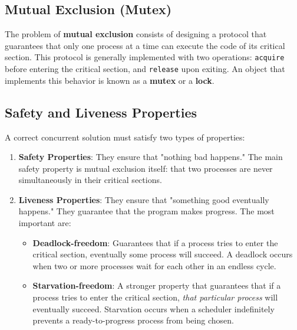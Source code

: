 \subsection{Mutual Exclusion (Mutex)}
The problem of \textbf{mutual exclusion} consists of designing a protocol that guarantees that only one process at a time can execute the code of its critical section. This protocol is generally implemented with two operations: \texttt{acquire} before entering the critical section, and \texttt{release} upon exiting. An object that implements this behavior is known as a \textbf{mutex} or a \textbf{lock}.

\subsection{Safety and Liveness Properties}
A correct concurrent solution must satisfy two types of properties:
\begin{enumerate}
    \item \textbf{Safety Properties}: They ensure that "nothing bad happens." The main safety property is mutual exclusion itself: that two processes are never simultaneously in their critical sections.
    \item \textbf{Liveness Properties}: They ensure that "something good eventually happens." They guarantee that the program makes progress. The most important are:
    \begin{itemize}
        \item \textbf{Deadlock-freedom}: Guarantees that if a process tries to enter the critical section, eventually some process will succeed. A deadlock occurs when two or more processes wait for each other in an endless cycle.
        \item \textbf{Starvation-freedom}: A stronger property that guarantees that if a process tries to enter the critical section, \textit{that particular process} will eventually succeed. Starvation occurs when a scheduler indefinitely prevents a ready-to-progress process from being chosen.
    \end{itemize}
\end{enumerate}

